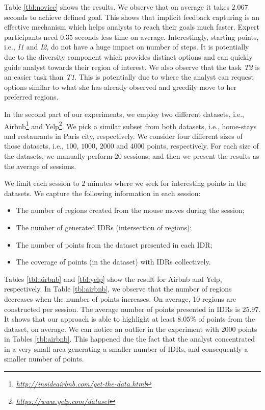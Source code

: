 \documentclass[sigconf,edbt]{acmart-edbt2019}
\begin{document}
\vspace{2pt}
Table \ref{tbl:novice} shows the results. We observe that on average it takes $2.067$ seconds to achieve defined goal. This shows that implicit feedback capturing is an effective mechanism which helps analysts to reach their goals much faster. Expert participants need $0.35$ seconds less time on average. Interestingly, starting points, i.e., {\em I1} and {\em I2}, do not have a huge impact on number of steps. It is potentially due to the diversity component which provides distinct options and can quickly guide analyst towards their region of interest. We also observe that the task {\em T2} is an easier task than {\em T1}. This is potentially due to  where the analyst can request options similar to what she has already observed and greedily move to her preferred regions.

\vspace{2pt}
In the second part of our experiments, we employ two different datasets, i.e., \textsf{Airbnb}\footnote{\it \url{http://insideairbnb.com/get-the-data.html}} and \textsf{Yelp}\footnote{\it \url{https://www.yelp.com/dataset}}. We pick a similar subset from both datasets, i.e., home-stays and restaurants in Paris city, respectively. We consider four different sizes of those datasets, i.e., $100$, $1000$, $2000$ and $4000$ points, respectively. For each size of the datasets, we manually perform $20$ sessions, and then we present the results as the average of sessions.

\vspace{2pt}
We limit each session to $2$ minutes where we seek for interesting points in the datasets. We capture the following information in each session:

\begin{itemize}[leftmargin=*]
  \item The number of regions created from the mouse moves during the session;
  \item The number of generated IDRs (intersection of regions);
  \item The number of points from the dataset presented in each IDR;
  \item The coverage of points (in the dataset) with IDRs collectively.
\end{itemize}  

\vspace{2pt}
Tables \ref{tbl:airbnb} and \ref{tbl:yelp} show the result for \textsf{Airbnb} and \textsf{Yelp}, respectively. In Table \ref{tbl:airbnb}, we observe that the number of regions decreases when the number of points increases. On average, 10 regions are constructed per session. The average number of points presented in IDRs is $25.97$. It shows that our approach is able to highlight at least $8.05\%$ of points from the dataset, on average. 
We can notice an outlier in the experiment with 2000 points  in Tables \ref{tbl:airbnb}. This happened due the fact that  the analyst concentrated in a very small area generating a smaller number of IDRs, and consequently a smaller number of points.
 
\end{document}
